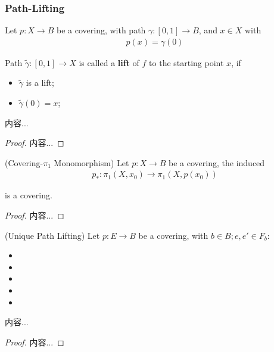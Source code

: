\documentclass[Total.tex]{subfiles}
\begin{document}
			\subsubsection{Path-Lifting}
			\begin{Def}
				Let $p:X\rightarrow B$ be a covering, with path $\gamma:[0,1]\rightarrow B$, and $x\in X$ with 
				\begin{gather*}
					p(x)=\gamma(0)
				\end{gather*}
				
				Path $\tilde{\gamma}:[0,1]\rightarrow X$ is called a \textbf{lift} of $f$ to the starting point $x$, if
				\begin{itemize}
					\item $\tilde{\gamma}$ is a lift;
					\item $\tilde{\gamma}(0)=x$;
				\end{itemize}
			\end{Def}
			\begin{proposition}
				内容...
			\end{proposition}
			\begin{proof}
				内容...
			\end{proof}
			
			\begin{proposition}
				(Covering-$\pi_1$ Monomorphism) Let $p:X\rightarrow B$ be a covering, the induced
				\begin{gather*}
					p_*:\pi_1(X,x_0)\rightarrow \pi_1(X,p(x_0))
				\end{gather*}
				
				is a covering.
			\end{proposition}
			\begin{proof}
				内容...
			\end{proof}
			\begin{proposition}
				(Unique Path Lifting) Let $p:E\rightarrow B$ be a covering, with $b\in B;e,e'\in F_b$:
				\begin{itemize}
					\item 
					\item 
					\item 
					\item 
					\item 
				\end{itemize}
			\end{proposition}
			\begin{proposition}
				内容...
			\end{proposition}
			\begin{proof}
				内容...
			\end{proof}
			
\end{document}
